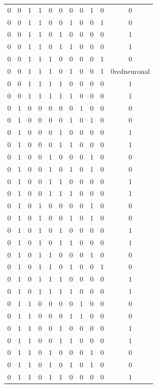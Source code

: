 \begin{longtable}{|c|c|c|c|c|c|c|c|c|c|c|}
0 & 0 & 1 & 1 & 0 & 0 & 0 &  0 & 1 & 0 & 0 \\
0 & 0 & 1 & 1 & 0 & 0 & 1 &  0 & 0 & 1 & 0 \\
0 & 0 & 1 & 1 & 0 & 1 & 0 &  0 & 0 & 0 & 1 \\
0 & 0 & 1 & 1 & 0 & 1 & 1 &  0 & 0 & 0 & 1 \\
0 & 0 & 1 & 1 & 1 & 0 & 0 &  0 & 0 & 1 & 0 \\
0 & 0 & 1 & 1 & 1 & 0 & 1 &  0 & 0 & 1 & 0redneuronal \\
0 & 0 & 1 & 1 & 1 & 1 & 0 &  0 & 0 & 0 & 1 \\
0 & 0 & 1 & 1 & 1 & 1 & 1 &  0 & 0 & 0 & 1 \\
0 & 1 & 0 & 0 & 0 & 0 & 0 &  1 & 0 & 0 & 0 \\
0 & 1 & 0 & 0 & 0 & 0 & 1 &  0 & 1 & 0 & 0 \\
0 & 1 & 0 & 0 & 0 & 1 & 0 &  0 & 0 & 0 & 1 \\
0 & 1 & 0 & 0 & 0 & 1 & 1 &  0 & 0 & 0 & 1 \\
0 & 1 & 0 & 0 & 1 & 0 & 0 &  0 & 1 & 0 & 0 \\
0 & 1 & 0 & 0 & 1 & 0 & 1 &  0 & 1 & 0 & 0 \\
0 & 1 & 0 & 0 & 1 & 1 & 0 &  0 & 0 & 0 & 1 \\
0 & 1 & 0 & 0 & 1 & 1 & 1 &  0 & 0 & 0 & 1 \\
0 & 1 & 0 & 1 & 0 & 0 & 0 &  0 & 1 & 0 & 0 \\
0 & 1 & 0 & 1 & 0 & 0 & 1 &  0 & 1 & 0 & 0 \\
0 & 1 & 0 & 1 & 0 & 1 & 0 &  0 & 0 & 0 & 1 \\
0 & 1 & 0 & 1 & 0 & 1 & 1 &  0 & 0 & 0 & 1 \\
0 & 1 & 0 & 1 & 1 & 0 & 0 &  0 & 1 & 0 & 0 \\
0 & 1 & 0 & 1 & 1 & 0 & 1 &  0 & 0 & 1 & 0 \\
0 & 1 & 0 & 1 & 1 & 1 & 0 &  0 & 0 & 0 & 1 \\
0 & 1 & 0 & 1 & 1 & 1 & 1 &  0 & 0 & 0 & 1 \\
0 & 1 & 1 & 0 & 0 & 0 & 0 &  1 & 0 & 0 & 0 \\
0 & 1 & 1 & 0 & 0 & 0 & 1 &  1 & 0 & 0 & 0 \\
0 & 1 & 1 & 0 & 0 & 1 & 0 &  0 & 0 & 0 & 1 \\
0 & 1 & 1 & 0 & 0 & 1 & 1 &  0 & 0 & 0 & 1 \\
0 & 1 & 1 & 0 & 1 & 0 & 0 &  0 & 1 & 0 & 0 \\
0 & 1 & 1 & 0 & 1 & 0 & 1 &  0 & 1 & 0 & 0 \\
0 & 1 & 1 & 0 & 1 & 1 & 0 &  0 & 0 & 0 & 1 \\

\end{longtable}
